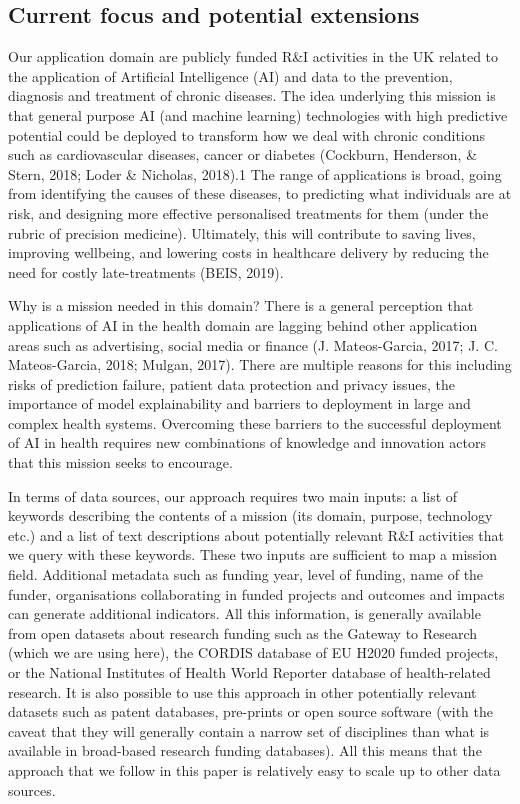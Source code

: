 \documentclass[11pt]{article}
\begin{document}
\subsection{Current focus and potential extensions}
\label{subsec: domain}

Our application domain are publicly funded R&I activities in the UK related to the application of Artificial Intelligence (AI) and data to the prevention, diagnosis and treatment of chronic diseases. The idea underlying this mission is that general purpose AI (and machine learning) technologies with high predictive potential could be deployed to transform how we deal with chronic conditions such as cardiovascular diseases, cancer or diabetes (Cockburn, Henderson, \& Stern, 2018; Loder \& Nicholas, 2018).1 The range of applications is broad, going from identifying the causes of these diseases, to predicting what individuals are at risk, and designing more effective personalised treatments for them (under the rubric of precision medicine). Ultimately, this will contribute to saving lives, improving wellbeing, and lowering costs in healthcare delivery by reducing the need for costly late-treatments (BEIS, 2019).

Why is a mission needed in this domain? There is a general perception that applications of AI in the health domain are lagging behind other application areas such as advertising, social media or finance (J. Mateos-Garcia, 2017; J. C. Mateos-Garcia, 2018; Mulgan, 2017). There are multiple reasons for this including risks of prediction failure, patient data protection and privacy issues, the importance of model explainability and barriers to deployment in large and complex health systems. Overcoming these barriers to the successful deployment of AI in health requires new combinations of knowledge and innovation actors that this mission seeks to encourage.

In terms of data sources, our approach requires two main inputs: a list of keywords describing the contents of a mission (its domain, purpose, technology etc.) and a list of text descriptions about potentially relevant R&I activities that we query with these keywords. These two inputs are sufficient to map a mission field. Additional metadata such as funding year, level of funding, name of the funder, organisations collaborating in funded projects and outcomes and impacts can generate additional indicators. All this information, is generally
available from open datasets about research funding such as the Gateway to Research (which we are using here), the CORDIS database of EU H2020 funded projects, or the National Institutes of Health World Reporter database of health-related research. It is also possible to use this approach in other potentially relevant datasets such as patent databases, pre-prints or open source software (with the caveat that they will generally contain a narrow set of disciplines than what is available in broad-based research funding databases). All this means that the approach that we follow in this paper is relatively easy to scale up to other data sources.
\end{document}
